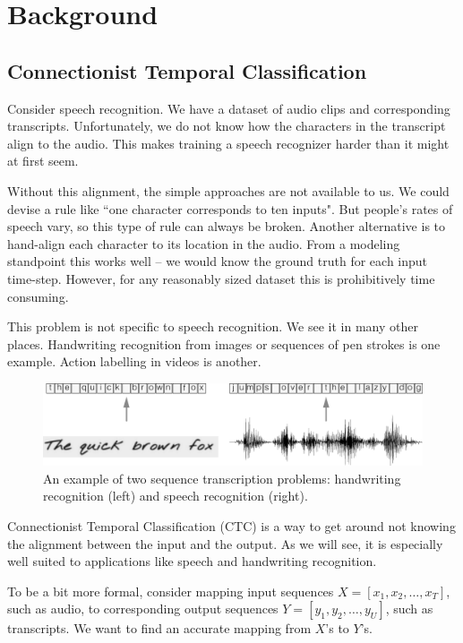 \chapter{Background}

\section{Connectionist Temporal Classification}

Consider speech recognition. We have a dataset of audio clips and corresponding
transcripts. Unfortunately, we do not know how the characters in the transcript
align to the audio. This makes training a speech recognizer harder than it
might at first seem.

Without this alignment, the simple approaches are not available to us. We could
devise a rule like ``one character corresponds to ten inputs". But people's
rates of speech vary, so this type of rule can always be broken.  Another
alternative is to hand-align each character to its location in the audio. From
a modeling standpoint this works well -- we would know the ground truth for
each input time-step. However, for any reasonably sized dataset this is
prohibitively time consuming.

This problem is not specific to speech recognition. We see it in many other
places. Handwriting recognition from images or sequences of pen strokes is one
example. Action labelling in videos is another.

\begin{figure}
\centering
\includegraphics[width=\textwidth]{background/figures/asr_hrr.pdf}
\caption{An example of two sequence transcription problems: handwriting
    recognition (left) and speech recognition (right).}
\label{fig:bg:asr_hrr} 
\end{figure}

Connectionist Temporal Classification (CTC) is a way to get around not knowing
the alignment between the input and the output. As we will see, it is
especially well suited to applications like speech and handwriting recognition.

To be a bit more formal, consider mapping input sequences $X = [x_1, x_2,
\ldots, x_T]$, such as audio, to corresponding output sequences $Y = [y_1, y_2,
\ldots, y_U]$, such as transcripts.  We want to find an accurate mapping from
$X$'s to $Y$'s.

